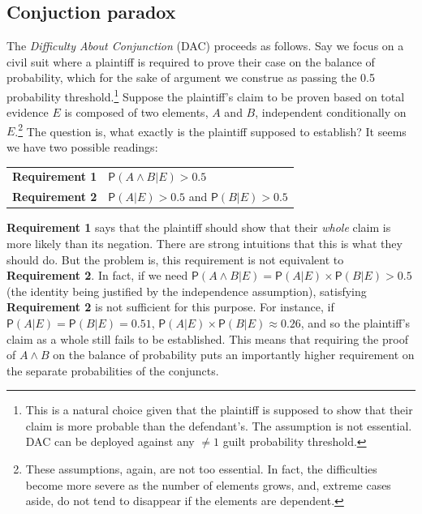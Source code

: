 \documentclass[10pt,dvipsnames,enabledeprecatedfontcommands]{scrartcl}
\newcommand{\et}{\wedge}
\newcommand{\pr}[1]{\mathsf{P}(#1)}
\begin{document}
\subsection{Conjuction paradox}\label{conjuction-paradox}

The \emph{Difficulty About Conjunction} (DAC) proceeds as follows. Say
we focus on a civil suit where a plaintiff is required to prove their
case on the balance of probability, which for the sake of argument we
construe as passing the 0.5 probability
threshold.\footnote{This is a natural choice given that the plaintiff is supposed to show that their claim is more probable than the defendant's. The assumption is not essential. DAC can be deployed against any $\neq 1$ guilt probability threshold.}
Suppose the plaintiff's claim to be proven based on total evidence \(E\)
is composed of two elements, \(A\) and \(B\), independent conditionally
on
\(E\).\footnote{These assumptions, again, are not  too essential. In fact, the difficulties become more severe as the number of elements grows, and, extreme cases aside, do not tend to disappear if the elements are dependent.}
The question is, what exactly is the plaintiff supposed to establish? It
seems we have two possible readings:

\begin{center}
\begin{tabular}
{@{}ll@{}}
\toprule
\textbf{Requirement 1}  &    $\pr{A\et B\vert E}>0.5$ \\ 
\textbf{Requirement 2} &    $\pr{A\vert E}>0.5$ and $\pr{B\vert E}>0.5$\\   
\bottomrule
\end{tabular}
\end{center}

\textbf{Requirement 1} says that the plaintiff should show that their
\emph{whole} claim is more likely than its negation. There are strong
intuitions that this is what they should do. But the problem is, this
requirement is not equivalent to \textbf{Requirement 2}. In fact, if we
need \(\pr{A\et B\vert E}=\pr{A\vert E}\times\pr{B\vert E}>0.5\) (the
identity being justified by the independence assumption), satisfying
\textbf{Requirement 2} is not sufficient for this purpose. For instance,
if \(\pr{A\vert E}=\pr{B\vert E}=0.51\),
\(\pr{A\vert E}\times \pr{B\vert E}\approx 0.26\), and so the
plaintiff's claim as a whole still fails to be established. This means
that requiring the proof of \(A\et B\) on the balance of probability
puts an importantly higher requirement on the separate probabilities of
the conjuncts.
\end{document}
